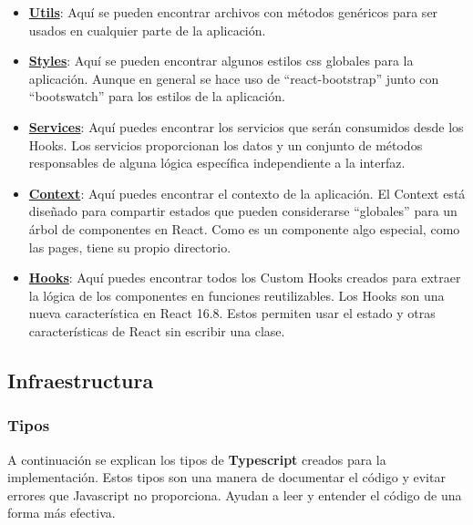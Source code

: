 \documentclass[12pt,twoside,titlepage]{report}
\begin{document}
\begin{itemize}
    \item \href{https://github.com/alberttogoca/EarFit/tree/main/src/utils}{\textbf{Utils}}: Aquí se pueden encontrar archivos con métodos genéricos para ser usados en cualquier parte de la aplicación.
    \item \href{https://github.com/alberttogoca/EarFit/tree/main/src/styles}{\textbf{Styles}}: Aquí se pueden encontrar algunos estilos css globales para la aplicación. Aunque en general se hace uso de ``react-bootstrap'' junto con ``bootswatch'' para los estilos de la aplicación.
    \item \href{https://github.com/alberttogoca/EarFit/tree/main/src/services}{\textbf{Services}}: Aquí puedes encontrar los servicios que serán consumidos desde los Hooks. Los servicios proporcionan los datos y un conjunto de métodos responsables de alguna lógica específica independiente a la interfaz.
    \item \href{https://github.com/alberttogoca/EarFit/tree/main/src/context}{\textbf{Context}}: Aquí puedes encontrar el contexto de la aplicación. El Context está diseñado para compartir estados que pueden considerarse “globales” para un árbol de componentes en React. Como es un componente algo especial, como las pages, tiene su propio directorio.
    \item \href{https://github.com/alberttogoca/EarFit/tree/main/src/hooks}{\textbf{Hooks}}: Aquí puedes encontrar todos los Custom Hooks creados para extraer la lógica de los componentes en funciones reutilizables. Los Hooks son una nueva característica en React 16.8. Estos permiten usar el estado y otras características de React sin escribir una clase.
\end{itemize}

\subsection{Infraestructura}

\subsubsection{Tipos}
\label{sec:tipos}

A continuación se explican los tipos de \textbf{Typescript} creados para la implementación. Estos tipos son una manera de documentar el código y evitar errores que Javascript no proporciona. Ayudan a leer y entender el código de una forma más efectiva.
\end{document}
